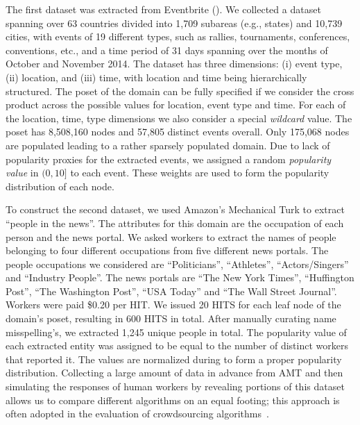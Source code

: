 The first dataset was extracted from Eventbrite (). We collected a dataset spanning over 63 countries divided into 1,709 subareas (e.g., states) and 10,739 cities, with events of 19 different types, such as rallies, tournaments, conferences, conventions, etc., and a time period of 31 days spanning over the months of October and November 2014. The dataset has three dimensions: (i) event type, (ii) location, and (iii) time, with location and time being hierarchically structured. The poset of the domain can be fully specified if we consider the cross product across the possible values for location, event type and time. For each of the location, time, type dimensions we also consider a special {\em wildcard} value. The poset has 8,508,160 nodes and 57,805 distinct events overall. Only 175,068 nodes are populated leading to a rather sparsely populated domain. Due to lack of popularity proxies for the extracted events, we assigned a random {\em popularity value} in $(0,10]$ to each event. These weights are used to form the popularity distribution of each node. 

To construct the second dataset, we used Amazon's Mechanical Turk to extract ``people in the news''. The attributes for this domain are the occupation of each person and the news portal. We asked workers to extract the names of people belonging to four different occupations from five different news portals. The people occupations we considered are ``Politicians'', ``Athletes'', ``Actors/Singers'' and ``Industry People''. The news portals are ``The New York Times'', ``Huffington Post'', ``The Washington Post'', ``USA  Today'' and ``The Wall Street Journal''. Workers were paid \$0.20 per HIT. We issued 20 HITS for each leaf node of the domain's poset, resulting in 600 HITS in total. After manually curating name misspelling's, we extracted 1,245 unique people in total. The popularity value of each extracted entity was assigned to be equal to the number of distinct workers that reported it. The values are normalized during to form a proper popularity distribution. Collecting a large amount of data in advance from AMT and then simulating the responses of human workers by revealing portions of this dataset allows us to compare different algorithms on an equal footing; this approach is often adopted in the evaluation of crowdsourcing algorithms~\cite{DBLP:journals/pvldb/ParameswaranBG0PW14, marcus:2011,trushkowsky:2013}.


